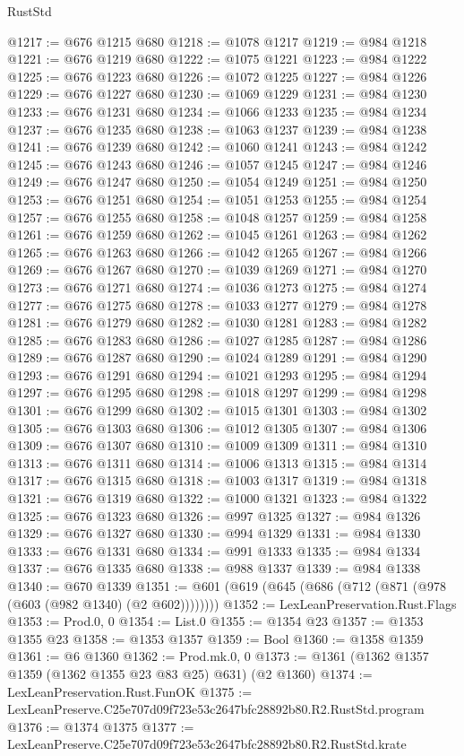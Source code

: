 \begin{lexlean}{RustStd}
\begin{coremodule}
@1217 := @676 @1215 @680
@1218 := @1078 @1217
@1219 := @984 @1218
@1221 := @676 @1219 @680
@1222 := @1075 @1221
@1223 := @984 @1222
@1225 := @676 @1223 @680
@1226 := @1072 @1225
@1227 := @984 @1226
@1229 := @676 @1227 @680
@1230 := @1069 @1229
@1231 := @984 @1230
@1233 := @676 @1231 @680
@1234 := @1066 @1233
@1235 := @984 @1234
@1237 := @676 @1235 @680
@1238 := @1063 @1237
@1239 := @984 @1238
@1241 := @676 @1239 @680
@1242 := @1060 @1241
@1243 := @984 @1242
@1245 := @676 @1243 @680
@1246 := @1057 @1245
@1247 := @984 @1246
@1249 := @676 @1247 @680
@1250 := @1054 @1249
@1251 := @984 @1250
@1253 := @676 @1251 @680
@1254 := @1051 @1253
@1255 := @984 @1254
@1257 := @676 @1255 @680
@1258 := @1048 @1257
@1259 := @984 @1258
@1261 := @676 @1259 @680
@1262 := @1045 @1261
@1263 := @984 @1262
@1265 := @676 @1263 @680
@1266 := @1042 @1265
@1267 := @984 @1266
@1269 := @676 @1267 @680
@1270 := @1039 @1269
@1271 := @984 @1270
@1273 := @676 @1271 @680
@1274 := @1036 @1273
@1275 := @984 @1274
@1277 := @676 @1275 @680
@1278 := @1033 @1277
@1279 := @984 @1278
@1281 := @676 @1279 @680
@1282 := @1030 @1281
@1283 := @984 @1282
@1285 := @676 @1283 @680
@1286 := @1027 @1285
@1287 := @984 @1286
@1289 := @676 @1287 @680
@1290 := @1024 @1289
@1291 := @984 @1290
@1293 := @676 @1291 @680
@1294 := @1021 @1293
@1295 := @984 @1294
@1297 := @676 @1295 @680
@1298 := @1018 @1297
@1299 := @984 @1298
@1301 := @676 @1299 @680
@1302 := @1015 @1301
@1303 := @984 @1302
@1305 := @676 @1303 @680
@1306 := @1012 @1305
@1307 := @984 @1306
@1309 := @676 @1307 @680
@1310 := @1009 @1309
@1311 := @984 @1310
@1313 := @676 @1311 @680
@1314 := @1006 @1313
@1315 := @984 @1314
@1317 := @676 @1315 @680
@1318 := @1003 @1317
@1319 := @984 @1318
@1321 := @676 @1319 @680
@1322 := @1000 @1321
@1323 := @984 @1322
@1325 := @676 @1323 @680
@1326 := @997 @1325
@1327 := @984 @1326
@1329 := @676 @1327 @680
@1330 := @994 @1329
@1331 := @984 @1330
@1333 := @676 @1331 @680
@1334 := @991 @1333
@1335 := @984 @1334
@1337 := @676 @1335 @680
@1338 := @988 @1337
@1339 := @984 @1338
@1340 := @670 @1339
@1351 := @601 (@619 (@645 (@686 (@712 (@871 (@978 (@603 (@982 @1340) (@2 @602))))))))
@1352 := LexLeanPreservation.Rust.Flags
@1353 := Prod.{0, 0}
@1354 := List.{0}
@1355 := @1354 @23
@1357 := @1353 @1355 @23
@1358 := @1353 @1357
@1359 := Bool
@1360 := @1358 @1359
@1361 := @6 @1360
@1362 := Prod.mk.{0, 0}
@1373 := @1361 (@1362 @1357 @1359 (@1362 @1355 @23 @83 @25) @631) (@2 @1360)
@1374 := LexLeanPreservation.Rust.FunOK
@1375 := LexLeanPreserve.C25e707d09f723e53c2647bfc28892b80.R2.RustStd.program
@1376 := @1374 @1375
@1377 := LexLeanPreserve.C25e707d09f723e53c2647bfc28892b80.R2.RustStd.krate

\end{coremodule}
\end{lexlean}
